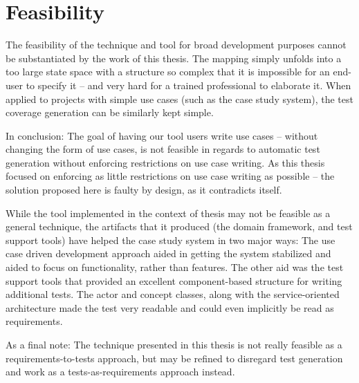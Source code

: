 \section{Feasibility}
The feasibility of the technique and tool for broad development purposes cannot be substantiated by the work of this thesis. The mapping simply unfolds into a too large state space with a structure so complex that it is impossible for an end-user to specify it -- and very hard for a trained professional to elaborate it. When applied to projects with simple use cases (such as the case study system), the test coverage generation can be similarly kept simple.\medskip

\noindent In conclusion: The goal of having our tool users write use cases -- without changing the form of use cases, is not feasible in regards to automatic test generation without enforcing restrictions on use case writing. As this thesis focused on enforcing as little restrictions on use case writing as possible -- the solution proposed here is faulty by design, as it contradicts itself.\medskip

\noindent While the tool implemented in the context of thesis may not be feasible as a general technique, the artifacts that it produced (the domain framework, and test support tools) have helped the case study system in two major ways: The use case driven development approach aided in getting the system stabilized and aided to focus on functionality, rather than features. The other aid was the test support tools that provided an excellent component-based structure for writing additional tests. The actor and concept classes, along with the service-oriented architecture made the test very readable and could even implicitly be read as requirements.\medskip

\noindent As a final note: The technique presented in this thesis is not really feasible as a requirements-to-tests approach, but may be refined to disregard test generation and work as a tests-as-requirements approach instead.
